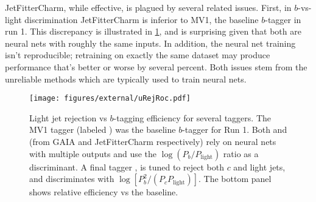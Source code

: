 JetFitterCharm, while effective, is plagued by several related issues.
First, in $b$-vs-light discrimination JetFitterCharm is inferior to MV1, the baseline $b$-tagger in run 1. This discrepancy is illustrated in \cref{fig:u-rej-roc}, and is surprising given that both are neural nets with roughly the same inputs.
In addition, the neural net training isn't reproducible; retraining on exactly the same dataset may produce performance that's better or worse by several percent.
Both issues stem from the unreliable methods which are typically used to train neural nets.

\begin{figure}
  \begin{center}
    \texttt{[image: figures/external/uRejRoc.pdf]}
    \caption[Light jet rejection as a function of $b$-tagging efficiency]{Light jet rejection vs $b$-tagging efficiency for several taggers. The MV1 tagger (labeled ) was the baseline $b$-tagger for Run 1. Both  and  (from  GAIA and JetFitterCharm respectively) rely on neural nets with multiple outputs and use the $\log (P_{b} / P_{\text{light}})$ ratio as a discriminant. A final tagger , is tuned to reject both $c$ and light jets, and discriminates with $\log [P_{b}^2 / (P_{c} P_{\text{light}})]$.  The bottom panel shows relative efficiency vs the  baseline.}
    \label{fig:u-rej-roc}
  \end{center}
\end{figure}


